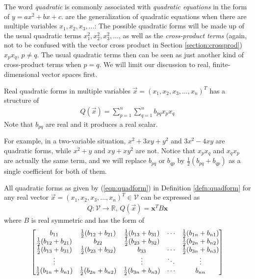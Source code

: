 The word \textit{quadratic} is commonly associated with \textit{quadratic equations} in the form of $y = ax^2 + bx + c$.  are the generalization of quadratic equations when there are multiple variables $x_1, x_2, x_3, \ldots$: The possible quadratic forms will be made up of the usual quadratic terms $x_1^2, x_2^2, x_3^2, \ldots$, as well as the \textit{cross-product terms} (again, not to be confused with the vector cross product in Section \ref{section:crossprod}) $x_px_q$, $p \neq q$. The usual quadratic terms then can be seen as just another kind of cross-product terms when $p = q$. We will limit our discussion to real, finite-dimensional vector spaces first.
\begin{defn}
\label{defn:quadform}
Real quadratic forms in multiple variables $\vec{x} = (x_1, x_2, x_3, \ldots, x_n)^T$ has a structure of
\begin{align}
Q(\vec{x}) = \sum_{p=1}^{n}\sum_{q=1}^{n} b_{pq} x_px_q \label{eqn:quadform}
\end{align}
Note that $b_{pq}$ are real and it produces a real scalar.
\end{defn}
For example, in a two-variable situation, $x^2 + 3xy + y^2$ and $3x^2 - 4xy$ are quadratic forms, while $x^2 + y$ and $xy + xy^2$ are not. Notice that $x_px_q$ and $x_qx_p$ are actually the same term, and we will replace $b_{pq}$ or $b_{qp}$ by $\frac{1}{2}(b_{pq} + b_{qp})$ as a single coefficient for both of them. 
\begin{proper}
\label{proper:quadformmatrix}
All quadratic forms as given by (\ref{eqn:quadform}) in Definition \ref{defn:quadform} for any real vector $\vec{x} = (x_1, x_2, x_3, \ldots, x_n)^T \in \mathcal{V}$ can be expressed as
\begin{align}
Q: \mathcal{V} \to \mathbb{R},\, Q(\vec{x}) = \textbf{x}^TB\textbf{x}
\end{align}
where $B$ is real symmetric and has the form of
\begin{align}
\left[\begin{array}{@{}ccccc@{}}
b_{11} & \frac{1}{2}(b_{12} + b_{21}) & \frac{1}{2}(b_{13} + b_{31}) & \cdots & \frac{1}{2}(b_{1n} + b_{n1}) \\
\frac{1}{2}(b_{12} + b_{21}) & b_{22} & \frac{1}{2}(b_{23} + b_{32}) & & \frac{1}{2}(b_{2n} + b_{n2}) \\
\frac{1}{2}(b_{13} + b_{31}) & \frac{1}{2}(b_{23} + b_{32}) & b_{33} & \cdots & \frac{1}{2}(b_{3n} + b_{n3})\\
\vdots &  & \vdots & \ddots & \vdots \\
\frac{1}{2}(b_{1n} + b_{n1}) & \frac{1}{2}(b_{2n} + b_{n2}) & \frac{1}{2}(b_{3n} + b_{n3}) & \cdots & b_{nn}
\end{array}\right]
\end{align}
\end{proper}
